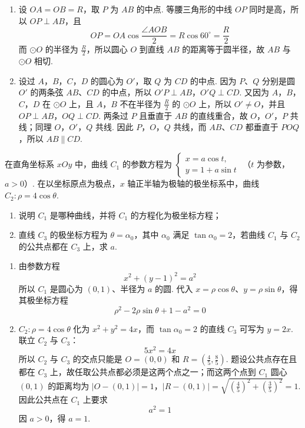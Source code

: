 \begin{solution}
\begin{enumerate}
\item 设 \(OA=OB=R\)，取 \(P\) 为 \(AB\) 的中点. 等腰三角形的中线 \(OP\) 同时是高，所以 \(OP\perp AB\)，且
\[
OP=OA\cos\frac{\angle AOB}{2}=R\cos60^\circ=\frac R2
\]
而 \(\odot O\) 的半径为 \(\frac{R}{2}\)，所以圆心 \(O\) 到直线 \(AB\) 的距离等于圆半径，故 \(AB\) 与 \(\odot O\) 相切.
\item 设过 \(A\)，\(B\)，\(C\)，\(D\) 的圆心为 \(O'\)，取 \(Q\) 为 \(CD\) 的中点. 因为 \(P\)、\(Q\) 分别是圆 \(O'\) 的两条弦 \(AB\)、\(CD\) 的中点，所以
\(O'P\perp AB\)，\(O'Q\perp CD\).
又因为 \(A\)，\(B\)，\(C\)，\(D\) 在 \(\odot O\) 上，且 \(A\)，\(B\) 不在半径为 \(\frac{R}{2}\) 的 \(\odot O\) 上，所以 \(O'\ne O\)，并且
\(OP\perp AB\)，\(OQ\perp CD\).
两条过 \(P\) 且垂直于 \(AB\) 的直线重合，故 \(O\)，\(O'\)，\(P\) 共线；同理 \(O\)，\(O'\)，\(Q\) 共线. 因此 \(P\)，\(O\)，\(Q\) 共线，而 \(AB\)、\(CD\) 都垂直于 \(POQ\)，所以 \(AB\parallel CD\).
\end{enumerate}
\end{solution}


\begin{problem}

在直角坐标系 \(xOy\) 中，曲线 \(C_1\) 的参数方程为
\(\begin{cases}
x=a\cos t,\\
y=1+a\sin t
\end{cases}\)
（\(t\) 为参数，\(a>0\)）.
在以坐标原点为极点，\(x\) 轴正半轴为极轴的极坐标系中，曲线 \(C_2:\rho=4\cos\theta\).

\begin{enumerate}
\item 说明 \(C_1\) 是哪种曲线，并将 \(C_1\) 的方程化为极坐标方程；
\item 直线 \(C_3\) 的极坐标方程为 \(\theta=\alpha_0\)，其中 \(\alpha_0\) 满足 \(\tan\alpha_0=2\)，若曲线 \(C_1\) 与 \(C_2\) 的公共点都在 \(C_3\) 上，求 \(a\).
\end{enumerate}
\end{problem}

\begin{solution}
\begin{enumerate}
\item 由参数方程
\[
x^2+(y-1)^2=a^2
\]
所以 \(C_1\) 是圆心为 \((0,1)\)、半径为 \(a\) 的圆. 代入 \(x=\rho\cos\theta\)、\(y=\rho\sin\theta\)，得其极坐标方程
\[
\rho^2-2\rho\sin\theta+1-a^2=0
\]
\item \(C_2:\rho=4\cos\theta\) 化为 \(x^2+y^2=4x\)，而 \(\tan\alpha_0=2\) 的直线 \(C_3\) 可写为 \(y=2x\). 联立 \(C_2\) 与 \(C_3\)：
\[
5x^2=4x
\]
所以 \(C_2\) 与 \(C_3\) 的交点只能是 \(O=(0,0)\) 和 \(R=(\frac{4}{5},\frac{8}{5})\). 题设公共点存在且都在 \(C_3\) 上，故任取公共点都必须是这两个点之一；而这两个点到 \(C_1\) 圆心 \((0,1)\) 的距离均为
\(|O-(0,1)|=1\)，\(|R-(0,1)|=\sqrt{\left(\frac45\right)^2+\left(\frac35\right)^2}=1\).
因此公共点在 \(C_1\) 上要求
\[
a^2=1
\]
因 \(a>0\)，得 \(a=1\).
\end{enumerate}
\end{solution}


